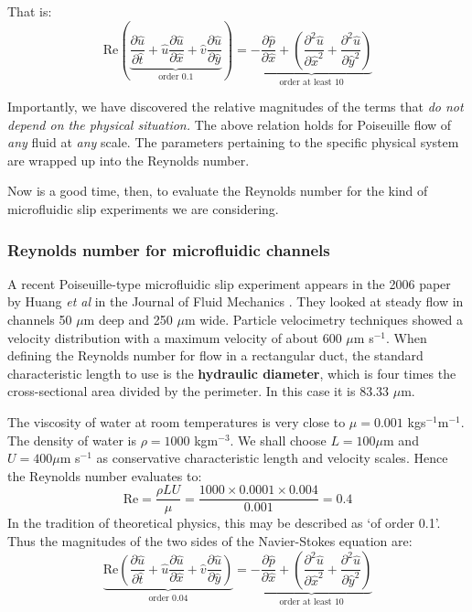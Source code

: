 \documentclass[a4paper]{report}
\begin{document}
That is:
\begin{equation}
\mathrm{Re} \left( 
\underbrace{ \frac{\partial \hat{u}}{\partial \hat{t}}  +
     \hat{u} \frac{\partial \hat{u}}{\partial \hat{x}}  +
     \hat{v} \frac{\partial \hat{u}}{\partial \hat{y}} }_{\text{order 0.1}} 
\right) = 
\underbrace{ - \frac{\partial \hat{p}}{\partial \hat{x}}
 + \left( 
          \frac{\partial^2 \hat{u}}{\partial \hat{x}^2}  + 
          \frac{\partial^2 \hat{u}}{\partial \hat{y}^2}
  \right) }_{\text{order at least 10}}
\end{equation}

Importantly, we have discovered the relative magnitudes of the terms that \emph{do not depend on the physical situation.}  The above relation holds for Poiseuille flow of \emph{any} fluid at \emph{any} scale.  The parameters pertaining to the specific physical system are wrapped up into the Reynolds number.

Now is a good time, then, to evaluate the Reynolds number for the kind of microfluidic slip experiments we are considering.

\subsubsection*{Reynolds number for microfluidic channels}

A recent Poiseuille-type microfluidic slip experiment appears in the 2006 paper by Huang \emph{et al} in the Journal of Fluid Mechanics \cite{Huang2006}.  They looked at steady flow in channels 50 $\mu$m deep and 250 $\mu$m wide.  Particle velocimetry techniques showed a velocity distribution with a maximum velocity of about 600 $\mu$m s$^{-1}$.
When defining the Reynolds number for flow in a rectangular duct, the standard characteristic length to use is the \textbf{hydraulic diameter}, which is four times the cross-sectional area divided by the perimeter.  In this case it is 83.33 $\mu$m.

The viscosity of water at room temperatures is very close to $\mu = 0.001$ kgs$^{-1}$m$^{-1}$.  The density of water is $\rho = 1000$ kgm$^{-3}$.  We shall choose $L = 100 \mu$m and $U = 400 \mu$m s$^{-1}$ as conservative characteristic length and velocity scales.
Hence the Reynolds number evaluates to:
\begin{equation}
\mathrm{Re} = \frac{\rho L U}{\mu} = \frac{1000 \times 0.0001 \times 0.004}{0.001} = 0.4
\end{equation}
In the tradition of theoretical physics, this may be described as `of order 0.1'.
Thus the magnitudes of the two sides of the Navier-Stokes equation are:
\begin{equation}
\underbrace{
\mathrm{Re} \left( 
             \frac{\partial \hat{u}}{\partial \hat{t}}  +
     \hat{u} \frac{\partial \hat{u}}{\partial \hat{x}}  +
     \hat{v} \frac{\partial \hat{u}}{\partial \hat{y}} 
           \right)
}_{\text{order 0.04}}   = 
\underbrace{ - \frac{\partial \hat{p}}{\partial \hat{x}}
 + \left( 
          \frac{\partial^2 \hat{u}}{\partial \hat{x}^2}  + 
          \frac{\partial^2 \hat{u}}{\partial \hat{y}^2}
  \right) }_{\text{order at least 10}}
\end{equation}
\end{document}
